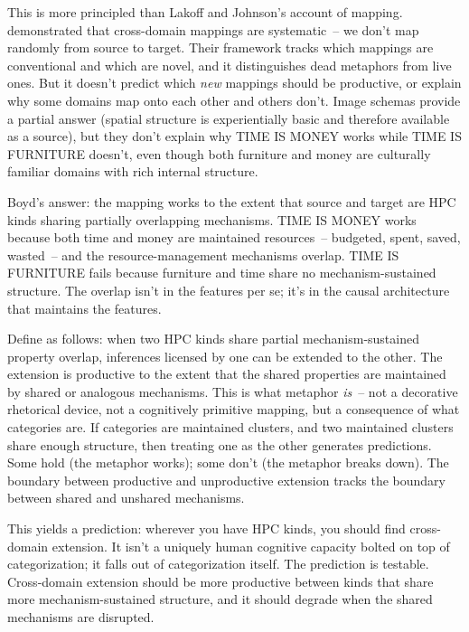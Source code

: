 This is more principled than Lakoff and Johnson's account of mapping. \textcite{lakoff1980} demonstrated that cross-domain mappings are systematic~-- we don't map randomly from source to target. Their framework tracks which mappings are conventional and which are novel, and it distinguishes dead metaphors from live ones. But it doesn't predict which \emph{new} mappings should be productive, or explain why some domains map onto each other and others don't. Image schemas provide a partial answer (spatial structure is experientially basic and therefore available as a source), but they don't explain why TIME IS MONEY works while TIME IS FURNITURE doesn't, even though both furniture and money are culturally familiar domains with rich internal structure.

Boyd's answer: the mapping works to the extent that source and target are HPC kinds sharing partially overlapping mechanisms. TIME IS MONEY works because both time and money are maintained resources~-- budgeted, spent, saved, wasted~-- and the resource-management mechanisms overlap. TIME IS FURNITURE fails because furniture and time share no mechanism-sustained structure. The overlap isn't in the features per se; it's in the causal architecture that maintains the features.

Define  as follows: when two HPC kinds share partial mechanism-sustained property overlap, inferences licensed by one can be extended to the other. The extension is productive to the extent that the shared properties are maintained by shared or analogous mechanisms. This is what metaphor \emph{is}~-- not a decorative rhetorical device, not a cognitively primitive mapping, but a consequence of what categories are. If categories are maintained clusters, and two maintained clusters share enough structure, then treating one as the other generates predictions. Some hold (the metaphor works); some don't (the metaphor breaks down). The boundary between productive and unproductive extension tracks the boundary between shared and unshared mechanisms.

This yields a prediction: wherever you have HPC kinds, you should find cross-domain extension. It isn't a uniquely human cognitive capacity bolted on top of categorization; it falls out of categorization itself. The prediction is testable. Cross-domain extension should be more productive between kinds that share more mechanism-sustained structure, and it should degrade when the shared mechanisms are disrupted.

